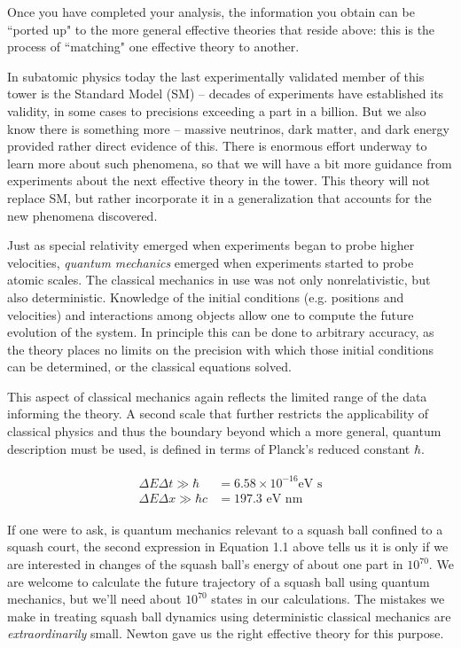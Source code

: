Once you have completed your analysis, the information you obtain can be
``ported up" to the more general effective theories that reside above: this is
the process of ``matching" one effective theory to another. 

In subatomic physics today the last experimentally validated member of this
tower is the Standard Model (SM) -- decades of experiments have established its
validity, in some cases to precisions exceeding a part in a billion. But we
also know there is something more -- massive neutrinos, dark matter, and dark
energy provided rather direct evidence of this. There is enormous effort
underway to learn more about such phenomena, so that we will have a bit more
guidance from experiments about the next effective theory in the tower. This
theory will not replace SM, but rather incorporate it in a generalization that
accounts for the new phenomena discovered.  

Just as special relativity emerged when experiments began to probe higher
velocities, \textit{quantum mechanics} emerged when experiments started to
probe atomic scales. The classical mechanics in use was not only
nonrelativistic, but also deterministic. Knowledge of the initial conditions
(e.g. positions and velocities) and interactions among objects
allow one to compute the future evolution of the system. In principle this can
be done to arbitrary accuracy, as the theory places no limits on the precision
with which those initial conditions can be determined, or the classical
equations solved. 

This aspect of classical mechanics again reflects the limited range of the data
informing the theory. A second scale that further restricts the applicability
of classical physics and thus the boundary beyond which a more general, quantum
description must be used, is defined in terms of Planck's reduced constant
$\hbar$. 

\begin{align}
  \begin{split}
    \Delta E \Delta t \gg \hbar &= 6.58 \times 10^{-16} \text{eV s} \\
    \Delta E \Delta x \gg \hbar c &= 197.3 \text{ eV nm} 
  \end{split}
\end{align}

If one were to ask, is quantum mechanics relevant to a squash ball confined to
a squash court, the second expression in Equation 1.1 above tells us it is only if
we are interested in changes of the squash ball's energy of about one part in
$10^{70}$. We are welcome to calculate the future trajectory of a squash ball
using quantum mechanics, but we'll need about $10^{70}$ states in our
calculations. The mistakes we make in treating squash ball dynamics using
deterministic classical mechanics are \textit{extraordinarily} small. Newton
gave us the right effective theory for this purpose.  


